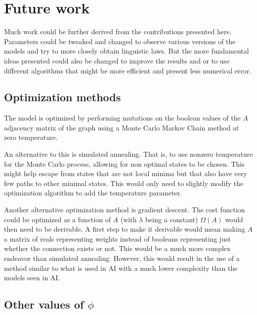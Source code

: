 \section{Future work}
\label{sec:discussion_future-work}

Much work could be further derived from the contributions presented here.
Parameters could be tweaked and changed to observe various versions of the models and try to more closely obtain linguistic laws.
But the more fundamental ideas presented could also be changed to improve the results and or to use different algorithms that might be more efficient and present less numerical error.

\subsection{Optimization methods}
\label{sec:discussion_future-work_optimization}

The model is optimized by performing mutations on the boolean values of the $A$ adjacency matrix of the graph using a Monte Carlo Markov Chain method at zero temperature.

An alternative to this is simulated annealing.
That is, to use nonzero temperature for the Monte Carlo process, allowing for non optimal states to be chosen.
This might help escape from states that are not local minima but that also have very few paths to other minimal states.
This would only need to slightly modify the optimization algorithm to add the temperature parameter.

Another alternative optimization method is gradient descent.
The cost function could be optimized as a function of $A$ (with $\lambda$ being a constant) $\Omega(A)$ would then need to be derivable.
A first step to make it derivable would mean making $A$ a matrix of reals representing weights instead of booleans representing just whether the connection exists or not.
This would be a much more complex endeavor than simulated annealing.
However, this would result in the use of a method similar to what is used in AI with a much lower complexity than the models seen in AI.


\subsection{Other values of $\phi$}
\label{sec:discussion_future-work_phi}

